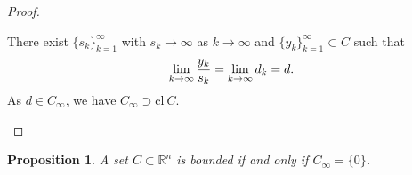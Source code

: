 \documentclass[a4paper,11pt, oneside]{book}
\newtheorem{prop}[thm]{Proposition}
\theoremstyle{definition}
\begin{document}
\begin{proof}
\begin{enumerate}[label=\roman*,align=CenterWithParen]
\begin{enumerate}[label=iii-\alph*,align=CenterWithParen2]
      There exist $\{s_k\}_{k=1}^{\infty}$ with $s_k \rightarrow \infty$ as $k \rightarrow \infty$ and $\{y_k\}_{k=1}^{\infty} \subset C$ such that
      \begin{equation}
        \lim_{k \to \infty} \frac{y_k}{s_k} = \lim_{k \to \infty} d_k = d. \notag
      \end{equation}
      As $d \in C_{\infty}$, we have $C_{\infty} \supset  \text{cl}\:C$.

    \end{enumerate}
  \end{enumerate}
\end{proof}

\begin{prop}
  A set $C \subset \mathbb{R}^n$ is bounded if and only if $C_\infty = \{0\}$.
\end{prop}
\end{document}
